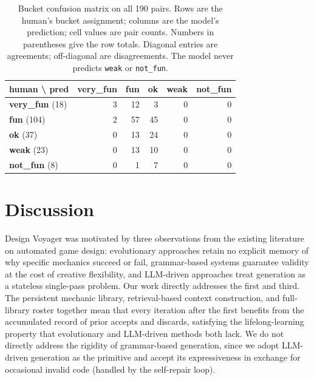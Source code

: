 \documentclass[conference]{IEEEtran}
\begin{document}
  \begin{table}[ht!]                                                            
  \centering                                                                  
  \caption{Bucket confusion matrix on all 190 pairs. Rows are the human's bucket
   assignment; columns are the model's prediction; cell values are pair counts. 
  Numbers in parentheses give the row totals. Diagonal entries are agreements;
  off-diagonal are disagreements. The model never predicts \texttt{weak} or     
  \texttt{not\_fun}.}                                                         
  \label{tab:confusion}                 
  \begin{tabular}{|l|r|r|r|r|r|}
  \hline                                                             
  \textbf{human \textbackslash{} pred} & \textbf{very\_fun} & \textbf{fun} &
  \textbf{ok} & \textbf{weak} & \textbf{not\_fun} \\                            
  \hline                                                             
  \textbf{very\_fun} (18) &  3 & 12 &  3 & 0 & 0 \\                             
  \hline                                                                      
  \textbf{fun} (104)      &  2 & 57 & 45 & 0 & 0 \\                  
  \hline                                                                        
  \textbf{ok} (37)        &  0 & 13 & 24 & 0 & 0 \\
  \hline                                                                        
  \textbf{weak} (23)      &  0 & 13 & 10 & 0 & 0 \\                             
  \hline                                       
  \textbf{not\_fun} (8)   &  0 &  1 &  7 & 0 & 0 \\                             
  \hline                                                                        
  \end{tabular}                                
  \end{table} 


 \section{Discussion}\label{sec:discussion}

Design Voyager was motivated by three observations from the existing literature on automated game design: evolutionary approaches retain no explicit memory of why specific mechanics succeed or fail, grammar-based systems guarantee validity at the cost of creative flexibility, and LLM-driven approaches treat generation as a stateless single-pass problem. Our work directly addresses the first and third. The persistent mechanic library, retrieval-based context construction, and full-library roster together mean that every iteration after the first benefits from the accumulated record of prior accepts and discards, satisfying the lifelong-learning property that evolutionary and LLM-driven methods both lack. We do not directly address the rigidity of grammar-based generation, since we adopt LLM-driven generation as the primitive and accept its expressiveness in exchange for occasional invalid code (handled by the self-repair loop).
\end{document}

